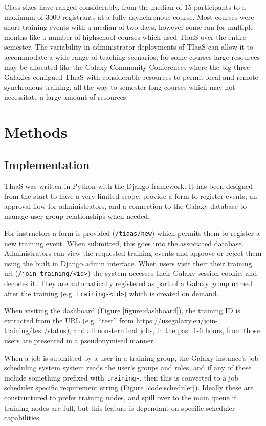 \documentclass[a4paper,num-refs]{oup-contemporary}
\begin{document}
Class sizes have ranged considerably, from the median of 15 participants to a maximum of 3000 registrants at a fully asynchronous course. Most courses were short training events with a median of two days, however some ran for multiple months like a number of highschool courses which used TIaaS over the entire semester. The variability in administrator deployments of TIaaS can allow it to accommodate a wide range of teaching scenarios; for some courses large resources may be allocated like the Galaxy Community Conferences where the big three Galaxies configued TIaaS with considerable resources to permit local and remote synchronous training, all the way to semester long courses which may not necessitate a large amount of resources.

\section{Methods}

\subsection{Implementation}
TIaaS was written in Python with the Django framework. It has been designed from the start to have a very limited scope: provide a form to register events, an approval flow for administrators, and a connection to the Galaxy database to manage user-group relationships when needed.

For instructors a form is provided (\texttt{/tiaas/new}) which permits them to register a new training event. When submitted, this goes into the associated database. Administrators can view the requested training events and approve or reject them using the built in Django admin interface. When users visit their their training url (\texttt{/join-training/<id>}) the system accesses their Galaxy session cookie, and decodes it. They are automatically registered as part of a Galaxy group named after the training (e.g. \texttt{training-<id>}) which is created on demand.

When visiting the dashboard (Figure \ref{figure:dashboard}), the training ID is extracted from the URL (e.g. ``test'' from \url{https://usegalaxy.eu/join-training/test/status}), and all non-terminal jobs, in the past 1-6 hours, from those users are presented in a pseudonymised manner.

When a job is submitted by a user in a training group, the Galaxy instance's job scheduling system system reads the user's groups and roles, and if any of these include something prefixed with \texttt{training-}, then this is converted to a job scheduler specific requirement string (Figure \ref{code:scheduler}). Ideally these are constructured to prefer training nodes, and spill over to the main queue if training nodes are full, but this feature is dependant on specific scheduler capabilities.
\end{document}
